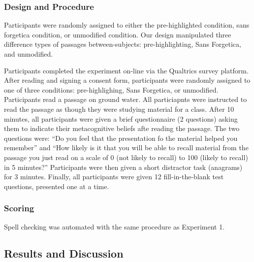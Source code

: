 \documentclass[english,pdf]{apa6}
\begin{document}
\hypertarget{design-and-procedure-1}{%
\subsubsection{Design and Procedure}\label{design-and-procedure-1}}

Participants were randomly assigned to either the pre-highlighted condition, sans forgetica condition, or unmodified condition. Our design manipulated three difference types of passages between-subjects: pre-highlighting, Sans Forgetica, and unmodified.

Participants completed the experiment on-line via the Qualtrics survey platform. After reading and signing a consent form, participants were randomly assigned to one of three conditions: pre-highlighing, Sans Forgetica, or unmodified. Participants read a passage on ground water. All particiapnts were instructed to read the passage as though they were studying material for a class. After 10 minutes, all participants were given a brief questionnaire (2 questions) asking them to indicate their metacognitive beliefs afte reading the passage. The two questions were: \enquote{Do you feel that the presentation fo the material helped you remember} and \enquote{How likely is it that you will be able to recall material from the passage you just read on a scale of 0 (not likely to recall) to 100 (likely to recall) in 5 minutes?} Participants were then given a short distractor task (anagrams) for 3 minutes. Finally, all participants were given 12 fill-in-the-blank test questions, presented one at a time.

\hypertarget{scoring-1}{%
\subsubsection{Scoring}\label{scoring-1}}

Spell checking was automated with the same procedure as Experiment 1.

\hypertarget{results-and-discussion-1}{%
\subsection{Results and Discussion}\label{results-and-discussion-1}}
\end{document}
